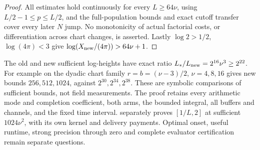 \begin{proof}
All estimates hold continuously for every \(L\ge64\nu\), using
\(L/2-1\le p\le L/2\), and the full-population bounds and exact cutoff
transfer cover every later \(N\) jump. No monotonicity of actual
factorial costs, or differentiation across chart changes, is asserted.
Lastly \(\log2>1/2\), \(\log(4\pi)<3\) give
\(\log(X_{\rm new}/(4\pi))>64\nu+1\).
\end{proof}

The old and new sufficient log-heights have exact ratio
\(L_*/L_{\rm new}=2^{16}\nu^3\ge2^{22}\).
For example on the dyadic chart family \(r=b=(\nu-3)/2\),
\(\nu=4,8,16\) gives new bounds \(256,512,1024\), against
\(2^{30},2^{34},2^{38}\).
These are symbolic comparisons of sufficient bounds, not field
measurements. The proof retains every arithmetic mode and completion
coefficient, both arms, the bounded integral, all buffers and channels,
and the fixed time interval.  separately proves
\([1/L,2]\) at sufficient \(1024\nu^2\), with its own kernel and delivery
payments. Optimal onset, useful runtime, strong precision through zero
and complete evaluator certification remain separate questions.
